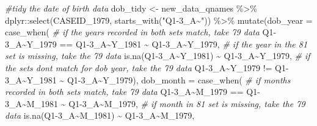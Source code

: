 \documentclass{article}
\newenvironment{Shaded}{\begin{snugshade}}{\end{snugshade}}
\newcommand{\AttributeTok}[1]{\textcolor[rgb]{0.77,0.63,0.00}{#1}}
\newcommand{\CommentTok}[1]{\textcolor[rgb]{0.56,0.35,0.01}{\textit{#1}}}
\newcommand{\FunctionTok}[1]{\textcolor[rgb]{0.00,0.00,0.00}{#1}}
\newcommand{\NormalTok}[1]{#1}
\newcommand{\OtherTok}[1]{\textcolor[rgb]{0.56,0.35,0.01}{#1}}
\newcommand{\SpecialCharTok}[1]{\textcolor[rgb]{0.00,0.00,0.00}{#1}}
\newcommand{\StringTok}[1]{\textcolor[rgb]{0.31,0.60,0.02}{#1}}
\begin{document}
\begin{Shaded}
\begin{Highlighting}[]
\CommentTok{\#tidy the date of birth data}
\NormalTok{dob\_tidy }\OtherTok{\textless{}{-}}\NormalTok{ new\_data\_qnames }\SpecialCharTok{\%\textgreater{}\%}
\NormalTok{  dplyr}\SpecialCharTok{::}\FunctionTok{select}\NormalTok{(CASEID\_1979,}
                \FunctionTok{starts\_with}\NormalTok{(}\StringTok{"Q1{-}3\_A\textasciitilde{}"}\NormalTok{)) }\SpecialCharTok{\%\textgreater{}\%}
  \FunctionTok{mutate}\NormalTok{(}\AttributeTok{dob\_year =} \FunctionTok{case\_when}\NormalTok{(}
    \CommentTok{\# if the years recorded in both sets match, take 79 data}
    \StringTok{\textasciigrave{}}\AttributeTok{Q1{-}3\_A\textasciitilde{}Y\_1979}\StringTok{\textasciigrave{}} \SpecialCharTok{==} \StringTok{\textasciigrave{}}\AttributeTok{Q1{-}3\_A\textasciitilde{}Y\_1981}\StringTok{\textasciigrave{}} \SpecialCharTok{\textasciitilde{}} \StringTok{\textasciigrave{}}\AttributeTok{Q1{-}3\_A\textasciitilde{}Y\_1979}\StringTok{\textasciigrave{}}\NormalTok{,}
    \CommentTok{\# if the year in the 81 set is missing, take the 79 data}
    \FunctionTok{is.na}\NormalTok{(}\StringTok{\textasciigrave{}}\AttributeTok{Q1{-}3\_A\textasciitilde{}Y\_1981}\StringTok{\textasciigrave{}}\NormalTok{) }\SpecialCharTok{\textasciitilde{}} \StringTok{\textasciigrave{}}\AttributeTok{Q1{-}3\_A\textasciitilde{}Y\_1979}\StringTok{\textasciigrave{}}\NormalTok{,}
    \CommentTok{\# if the sets don\textquotesingle{}t match for dob year, take the 79 data}
    \StringTok{\textasciigrave{}}\AttributeTok{Q1{-}3\_A\textasciitilde{}Y\_1979}\StringTok{\textasciigrave{}} \SpecialCharTok{!=} \StringTok{\textasciigrave{}}\AttributeTok{Q1{-}3\_A\textasciitilde{}Y\_1981}\StringTok{\textasciigrave{}} \SpecialCharTok{\textasciitilde{}} \StringTok{\textasciigrave{}}\AttributeTok{Q1{-}3\_A\textasciitilde{}Y\_1979}\StringTok{\textasciigrave{}}\NormalTok{),}
    \AttributeTok{dob\_month =} \FunctionTok{case\_when}\NormalTok{(}
      \CommentTok{\# if months recorded in both sets match, take 79 data}
      \StringTok{\textasciigrave{}}\AttributeTok{Q1{-}3\_A\textasciitilde{}M\_1979}\StringTok{\textasciigrave{}} \SpecialCharTok{==} \StringTok{\textasciigrave{}}\AttributeTok{Q1{-}3\_A\textasciitilde{}M\_1981}\StringTok{\textasciigrave{}} \SpecialCharTok{\textasciitilde{}} \StringTok{\textasciigrave{}}\AttributeTok{Q1{-}3\_A\textasciitilde{}M\_1979}\StringTok{\textasciigrave{}}\NormalTok{,}
      \CommentTok{\# if month in 81 set is missing, take the 79 data}
      \FunctionTok{is.na}\NormalTok{(}\StringTok{\textasciigrave{}}\AttributeTok{Q1{-}3\_A\textasciitilde{}M\_1981}\StringTok{\textasciigrave{}}\NormalTok{) }\SpecialCharTok{\textasciitilde{}} \StringTok{\textasciigrave{}}\AttributeTok{Q1{-}3\_A\textasciitilde{}M\_1979}\StringTok{\textasciigrave{}}\NormalTok{,}

\end{Highlighting}
\end{Shaded}
\end{document}
